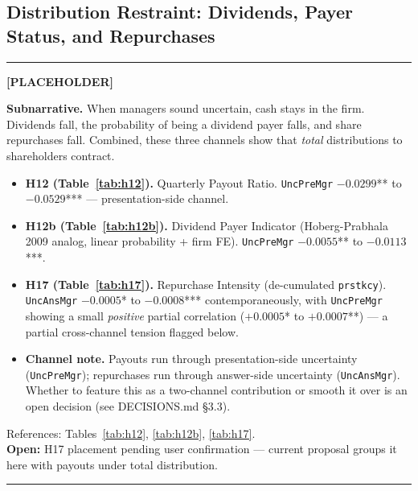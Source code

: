 \documentclass[11pt,a4paper,twocolumn]{article}
\newenvironment{placeholder}{%
  \par\medskip\noindent%
  {\color{placeholderaccent}\rule{\linewidth}{0.4pt}}\par%
  \noindent\textbf{\color{placeholderaccent}[PLACEHOLDER]}\par%
  \smallskip\itshape%
}{%
  \par\upshape\smallskip%
  {\color{placeholderaccent}\rule{\linewidth}{0.4pt}}\par\medskip%
}
\begin{document}
\subsection{Distribution Restraint: Dividends, Payer Status, and Repurchases}
\label{sec:payout}
\begin{placeholder}
\textbf{Subnarrative.} When managers sound uncertain, cash stays in
the firm. Dividends fall, the probability of being a dividend payer
falls, and share repurchases fall. Combined, these three channels
show that \emph{total} distributions to shareholders contract.
\begin{itemize}
  \item \textbf{H12 (Table~\ref{tab:h12}).} Quarterly Payout Ratio.
        \texttt{UncPreMgr} $-0.0299$** to $-0.0529$*** ---
        presentation-side channel.
  \item \textbf{H12b (Table~\ref{tab:h12b}).} Dividend Payer Indicator
        (Hoberg-Prabhala 2009 analog, linear probability + firm FE).
        \texttt{UncPreMgr} $-0.0055$** to $-0.0113$***.
  \item \textbf{H17 (Table~\ref{tab:h17}).} Repurchase Intensity
        (de-cumulated \texttt{prstkcy}). \texttt{UncAnsMgr} $-0.0005$* to
        $-0.0008$*** contemporaneously, with \texttt{UncPreMgr} showing
        a small \emph{positive} partial correlation ($+0.0005$* to
        $+0.0007$**) --- a partial cross-channel tension flagged below.
  \item \textbf{Channel note.} Payouts run through presentation-side
        uncertainty (\texttt{UncPreMgr}); repurchases run through
        answer-side uncertainty (\texttt{UncAnsMgr}). Whether to
        feature this as a two-channel contribution or smooth it over
        is an open decision (see DECISIONS.md \S3.3).
\end{itemize}
References: Tables~\ref{tab:h12}, \ref{tab:h12b}, \ref{tab:h17}.\\
\textbf{Open:} H17 placement pending user confirmation --- current
proposal groups it here with payouts under total distribution.
\end{placeholder}

\end{document}
